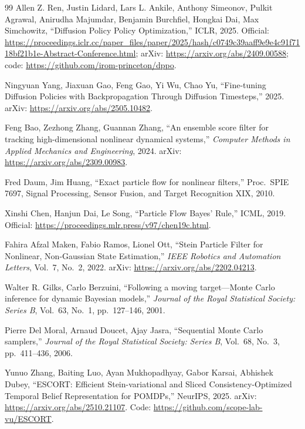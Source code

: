 \documentclass[a4paper,11pt]{article}
\begin{document}
\begin{thebibliography}{99}
Allen Z. Ren, Justin Lidard, Lars L. Ankile, Anthony Simeonov, Pulkit Agrawal,
Anirudha Majumdar, Benjamin Burchfiel, Hongkai Dai, Max Simchowitz,
``Diffusion Policy Policy Optimization,'' ICLR, 2025.
Official: \url{https://proceedings.iclr.cc/paper_files/paper/2025/hash/c0749c39aaff9e9e4c91f7118bf21b1e-Abstract-Conference.html};
arXiv: \url{https://arxiv.org/abs/2409.00588};
code: \url{https://github.com/irom-princeton/dppo}.

Ningyuan Yang, Jiaxuan Gao, Feng Gao, Yi Wu, Chao Yu,
``Fine-tuning Diffusion Policies with Backpropagation Through Diffusion Timesteps,'' 2025.
arXiv: \url{https://arxiv.org/abs/2505.10482}.

Feng Bao, Zezhong Zhang, Guannan Zhang,
``An ensemble score filter for tracking high-dimensional nonlinear dynamical systems,''
\emph{Computer Methods in Applied Mechanics and Engineering}, 2024.
arXiv: \url{https://arxiv.org/abs/2309.00983}.

Fred Daum, Jim Huang,
``Exact particle flow for nonlinear filters,''
Proc.\ SPIE 7697, Signal Processing, Sensor Fusion, and Target Recognition XIX, 2010.

Xinshi Chen, Hanjun Dai, Le Song,
``Particle Flow Bayes' Rule,'' ICML, 2019.
Official: \url{https://proceedings.mlr.press/v97/chen19c.html}.

Fahira Afzal Maken, Fabio Ramos, Lionel Ott,
``Stein Particle Filter for Nonlinear, Non-Gaussian State Estimation,''
\emph{IEEE Robotics and Automation Letters}, Vol.~7, No.~2, 2022.
arXiv: \url{https://arxiv.org/abs/2202.04213}.

Walter R. Gilks, Carlo Berzuini,
``Following a moving target---Monte Carlo inference for dynamic Bayesian models,''
\emph{Journal of the Royal Statistical Society: Series B}, Vol.~63, No.~1, pp.~127--146, 2001.

Pierre Del Moral, Arnaud Doucet, Ajay Jasra,
``Sequential Monte Carlo samplers,''
\emph{Journal of the Royal Statistical Society: Series B}, Vol.~68, No.~3, pp.~411--436, 2006.

Yunuo Zhang, Baiting Luo, Ayan Mukhopadhyay, Gabor Karsai, Abhishek Dubey,
``ESCORT: Efficient Stein-variational and Sliced Consistency-Optimized Temporal Belief Representation for POMDPs,''
NeurIPS, 2025.
arXiv: \url{https://arxiv.org/abs/2510.21107}. Code: \url{https://github.com/scope-lab-vu/ESCORT}.

\end{thebibliography}
\end{document}
